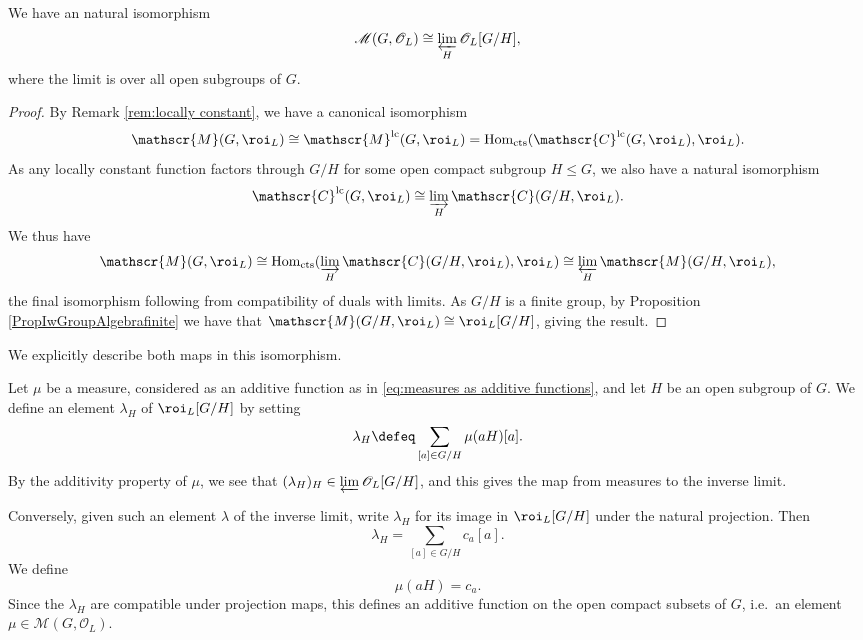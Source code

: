 \documentclass[a4paper,10pt, english, reqno]{smfart}
\newcommand{\sM}{\mathscr{M}}
\newcommand{\sC}{\mathscr{C}}
\numberwithin{equation}{section}
\begin{document}
\begin{proposition}\label{prop:iwasawa algebra measures}
We have an natural isomorphism
\[\mathscr{M}(G, \mathscr{O}_L) \cong \varprojlim_H \mathscr{O}_L[G/H],\]
where the limit is over all open subgroups of $G$. 
\end{proposition}


\begin{proof}
By Remark \ref{rem:locally constant}, we have a canonical isomorphism
\[
    \sM(G,\roi_L) \cong \sM^{\mathrm{lc}}(G,\roi_L) = \mathrm{Hom}_{\mathrm{cts}}(\sC^{\mathrm{lc}}(G,\roi_L),\roi_L). 
\]
As any locally constant function factors through $G/H$ for some open compact subgroup $H \leq G$, we also have a natural isomorphism
\[
    \sC^{\mathrm{lc}}(G,\roi_L) \cong \varinjlim_H \mathscr{C}(G / H, \roi_L).
\]
We thus have
\begin{equation}\label{eq:measures as inverse limit}
\mathscr{M}(G, \roi_L) \cong \mathrm{Hom}_{\rm cts}(\varinjlim_H \mathscr{C}(G / H, \roi_L), \roi_L) \cong \varprojlim_H \mathscr{M}(G/ H, \roi_L),
\end{equation}
the final isomorphism following from compatibility of duals with limits. 
As $G/H$ is a finite group, by Proposition \ref{PropIwGroupAlgebrafinite} we have that $\mathscr{M}(G/ H, \roi_L) \cong \roi_L[G/H]$, giving the result.
\end{proof}


We explicitly describe both maps in this isomorphism.

Let $\mu$ be a measure, considered as an additive function as in \eqref{eq:measures as additive functions}, and let $H$ be an open subgroup of $G$. We define an element $\lambda_H$ of $\roi_L[G/H]$ by setting 
\[
    \lambda_H \defeq \sum_{[a] \in G/H}\mu(aH)[a].
\]
By the additivity property of $\mu$, we see that $(\lambda_H)_H \in \varprojlim \mathscr{O}_L[G/H]$, and this gives the map from measures to the inverse limit.

Conversely, given such an element $\lambda$ of the inverse limit, write $\lambda_H$ for its image in $\roi_L[G/H]$ under the natural projection. Then 
\[\lambda_H = \sum_{[a] \in G/H} c_a[a].\]
We define
\[\mu(aH) = c_a.\]
Since the $\lambda_H$ are compatible under projection maps, this defines an additive function on the open compact subsets of $G$, i.e.\ an element $\mu \in \mathscr{M}(G, \mathscr{O}_L)$.
\end{document}
